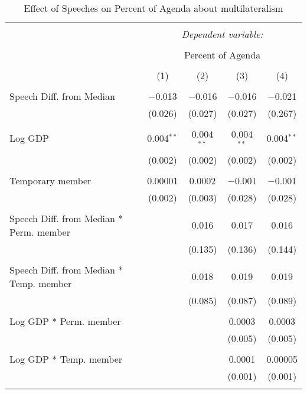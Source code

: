 
\begin{table}[!htbp] \centering 
  \caption{Effect of Speeches on Percent of Agenda about multilateralism} 
  \label{} 
\begin{tabular}{@{\extracolsep{5pt}}lcccc} 
\\[-1.8ex]\hline 
\hline \\[-1.8ex] 
 & \multicolumn{4}{c}{\textit{Dependent variable:}} \\ 
\cline{2-5} 
\\[-1.8ex] & \multicolumn{4}{c}{Percent of Agenda} \\ 
\\[-1.8ex] & (1) & (2) & (3) & (4)\\ 
\hline \\[-1.8ex] 
 Speech Diff. from Median & $-$0.013 & $-$0.016 & $-$0.016 & $-$0.021 \\ 
  & (0.026) & (0.027) & (0.027) & (0.267) \\ 
  & & & & \\ 
 Log GDP & 0.004$^{**}$ & 0.004$^{**}$ & 0.004$^{**}$ & 0.004$^{**}$ \\ 
  & (0.002) & (0.002) & (0.002) & (0.002) \\ 
  & & & & \\ 
 Temporary member & 0.00001 & 0.0002 & $-$0.001 & $-$0.001 \\ 
  & (0.002) & (0.003) & (0.028) & (0.028) \\ 
  & & & & \\ 
 Speech Diff. from Median * Perm. member &  & 0.016 & 0.017 & 0.016 \\ 
  &  & (0.135) & (0.136) & (0.144) \\ 
  & & & & \\ 
 Speech Diff. from Median * Temp. member &  & 0.018 & 0.019 & 0.019 \\ 
  &  & (0.085) & (0.087) & (0.089) \\ 
  & & & & \\ 
 Log GDP * Perm. member &  &  & 0.0003 & 0.0003 \\ 
  &  &  & (0.005) & (0.005) \\ 
  & & & & \\ 
 Log GDP * Temp. member &  &  & 0.0001 & 0.00005 \\ 
  &  &  & (0.001) & (0.001) \\ 
  & & & & \\ 

\end{tabular}
\end{table}
